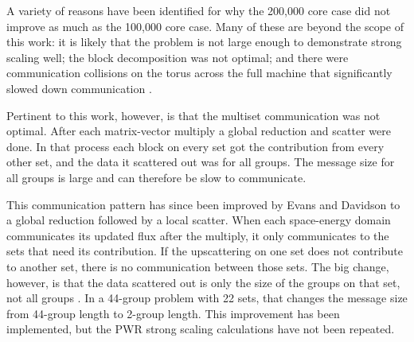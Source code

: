A variety of reasons have been identified for why the 200,000 core case did not improve as much as the 100,000 core case. Many of these are beyond the scope of this work: it is likely that the problem is not large enough to demonstrate strong scaling well; the block decomposition was not optimal; and there were communication collisions on the torus across the full machine that significantly slowed down communication \cite{Davidson2010}. 

Pertinent to this work, however, is that the multiset communication was not optimal. After each matrix-vector multiply a global reduction and scatter were done. In that process each block on every set got the contribution from every other set, and the data it scattered out was for all groups. The message size for all groups is large and can therefore be slow to communicate.

This communication pattern has since been improved by Evans and Davidson to a global reduction followed by a local scatter. When each space-energy domain communicates its updated flux after the multiply, it only communicates to the sets that need its contribution. If the upscattering on one set does not contribute to another set, there is no communication between those sets. The big change, however, is that the data scattered out is only the size of the groups on that set, not all groups \cite{Evans2011b}. In a 44-group problem with 22 sets, that changes the message size from 44-group length to 2-group length. This improvement has been implemented, but the PWR strong scaling calculations have not been repeated. 

